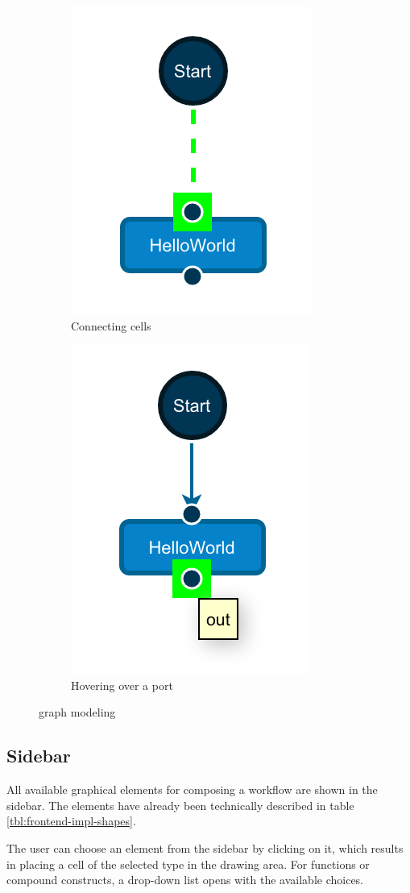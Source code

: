 \documentclass[a4paper,top=25mm,bottom=25mm,12pt,pdftex,halfparskip,twoside,bibtotoc,numbers=noenddot]{scrbook}
\begin{document}
\begin{figure}
\centering
\begin{subfigure}{.4\textwidth}
  \centering
  \includegraphics[width=.4\linewidth]{connect}
  \caption{Connecting cells}
\end{subfigure}
\begin{subfigure}{.4\textwidth}
  \centering
  \includegraphics[width=.4\linewidth]{port-hover}
  \caption{Hovering over a port}
\end{subfigure}
\caption{graph modeling}
\label{fig:cell-behaviour}
\end{figure}

\subsection{Sidebar}

All available graphical elements for composing a workflow are shown in the sidebar. The elements have already been technically described in table \ref{tbl:frontend-impl-shapes}.

The user can choose an element from the sidebar by clicking on it, which results in placing a cell of the selected type in the drawing area. For functions or compound constructs, a drop-down list opens with the available choices.
\end{document}
